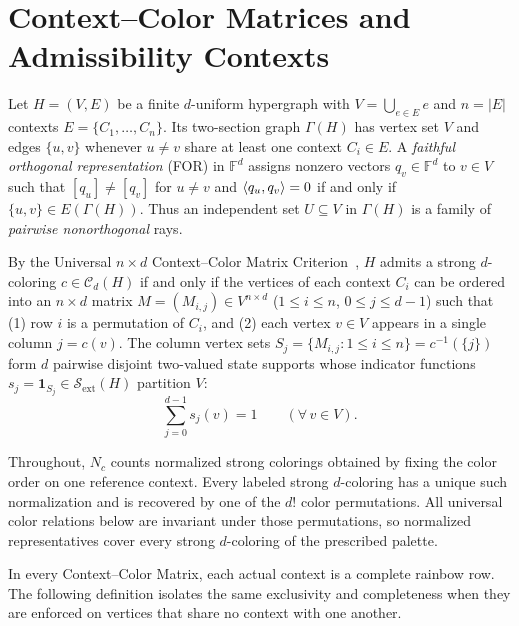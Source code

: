 \documentclass[aps,pra,reprint,superscriptaddress,longbibliography,nofootinbib,floatfix,10pt]{revtex4-2}
\theoremstyle{definition}\newtheorem{definition}[theorem]{Definition}
\theoremstyle{remark}\newtheorem{remark}[theorem]{Remark}
\newcommand{\F}{\mathbb F}\newcommand{\Z}{\mathbb Z}\newcommand{\PP}{\mathbb P}
\newcommand{\Sc}{\mathcal S}\newcommand{\Cc}{\mathcal C}\newcommand{\Wc}{\mathcal W}
\begin{document}
\section{Context--Color Matrices and Admissibility Contexts}\label{sec:framework}

Let $H=(V,E)$ be a finite $d$-uniform hypergraph with $V=\bigcup_{e\in E}e$ and $n=|E|$ contexts $E=\{C_1,\ldots,C_n\}$. Its two-section graph $\Gamma(H)$ has vertex set $V$ and edges $\{u,v\}$ whenever $u\neq v$ share at least one context $C_i\in E$. A \emph{faithful orthogonal representation} (FOR) in $\F^d$ assigns nonzero vectors $q_v\in\F^d$ to $v\in V$ such that $[q_u]\neq[q_v]$ for $u\neq v$ and $\langle q_u,q_v\rangle=0$ if and only if $\{u,v\}\in E(\Gamma(H))$. Thus an independent set $U\subseteq V$ in $\Gamma(H)$ is a family of \emph{pairwise nonorthogonal} rays.

By the Universal $n\times d$ Context--Color Matrix Criterion~\cite[Theorem~1]{2026-latin-context-matrix}, $H$ admits a strong $d$-coloring $c\in\Cc_d(H)$ if and only if the vertices of each context $C_i$ can be ordered into an $n\times d$ matrix $M=(M_{i,j})\in V^{n\times d}$ ($1\le i\le n$, $0\le j\le d-1$) such that (1) row $i$ is a permutation of $C_i$, and (2) each vertex $v\in V$ appears in a single column $j=c(v)$. The column vertex sets $S_j=\{M_{i,j}:1\le i\le n\}=c^{-1}(\{j\})$ form $d$ pairwise disjoint two-valued state supports whose indicator functions $s_j=\mathbf{1}_{S_j}\in\Sc_{\mathrm{ext}}(H)$ partition $V$:
\begin{equation}\label{eq:color-class-partition}
\sum_{j=0}^{d-1} s_j(v) = 1 \qquad (\forall\, v\in V).
\end{equation}

Throughout, $N_c$ counts normalized strong colorings obtained by fixing the color order on one reference context. Every labeled strong $d$-coloring has a unique such normalization and is recovered by one of the $d!$ color permutations. All universal color relations below are invariant under those permutations, so normalized representatives cover every strong $d$-coloring of the prescribed palette.

In every Context--Color Matrix, each actual context is a complete rainbow row. The following definition isolates the same exclusivity and completeness when they are enforced on vertices that share no context with one another.
\end{document}
